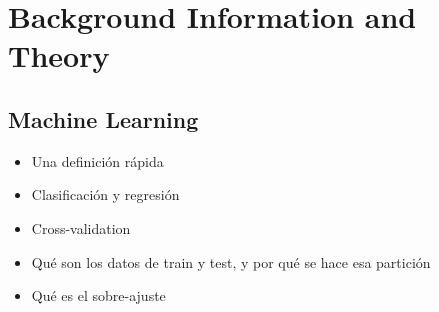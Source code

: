 
\chapter{Background Information and Theory} %

\label{Chapter2} %


\section{Machine Learning}
\begin{note}
  \begin{itemize}
    \item Una definición rápida
    \item Clasificación y regresión
    \item Cross-validation
    \item Qué son los datos de train y test, y por qué se hace esa partición
    \item Qué es el sobre-ajuste
  \end{itemize}
\end{note}

